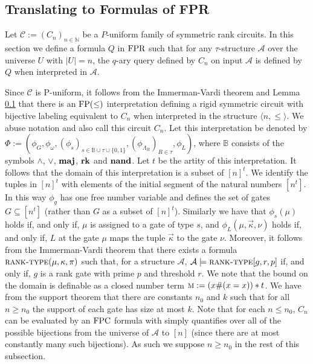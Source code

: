 \documentclass[../paper.tex]{subfiles}
\begin{document}
\subsection{Translating to Formulas of FPR}
Let $\mathcal{C}:= (C_n)_{n \in \mathbb{N}}$ be a $P$-uniform family of
symmetric rank circuits. In this section we define a formula $Q$ in $\text{\upshape FPR}$ such
that for any $\tau$-structure $\mathcal{A}$ over the universe $U$ with $\vert U
\vert = n$, the $q$-ary query defined by $C_n$ on input $\mathcal{A}$ is defined
by $Q$ when interpreted in $\mathcal{A}$.

Since $\mathcal{C}$ is P-uniform, it follows from the Immerman-Vardi theorem and Lemma \ref{} that there is an $\text{\upshape FP}(\leq)$ interpretation defining a rigid symmetric circuit with bijective labeling equivalent to $C_n$ when interpreted in the structure $\langle n, \leq \rangle$. We abuse notation and also call this circuit $C_n$. Let this interpretation be denoted by $\Phi :=  (\phi_G, \phi_\omega, (\phi_s)_{ s \in \mathbb{B} \cup \tau \cup \{0,1\}}, (\phi_{\Lambda_R})_{R \in \tau}, \phi_L)$, where $\mathbb{B}$ consists of the symbols $\land$, $\lor$, $\text{\textbf{maj}}$, $\text{\textbf{rk}}$ and $\text{\textbf{nand}}$. Let $t$ be the artity of this interpretation. It follows that the domain of this interpretation is a subset of $[n]^t$. We identify the tuples in $[n]^t$ with elements of the initial segment of the natural numbers $[n^t]$. In this way $\phi_g$ has one free number variable and defines the set of gates $G \subseteq [n^t]$ (rather than $G$ as a subset of $[n]^t$). Similarly we have that $\phi_s (\mu)$ holds if, and only if, $\mu$ is assigned to a gate of type $s$, and $\phi_L (\mu, \vec{\kappa}, \nu)$ holds if, and only if, $L$ at the gate $\mu$ maps the tuple $\vec{\kappa}$ to the gate $\nu$. Moreover, it follows from the Immerman-Vardi theorem that there exists a formula $\textsc{rank-type}(\mu, \kappa , \pi)$ such that, for a structure $\mathcal{A}$, $\mathcal{A} \models \textsc{rank-type}[g, r, p]$ if, and only if, $g$ is a rank gate with prime $p$ and threshold $r$. We note that the bound on the domain is definable as a closed number term $\textsc{m} := (x\# (x = x))*t$. 
We have from the support theorem that there are constants $n_0$ and $k$ such that for all $n \geq n_0$ the support of each gate has size at most $k$. Note that for each $n \leq n_0$, $C_n$ can be evaluated by an $\text{\upshape FPC}$ formula with simply quantifies over all of the possible bijections from the universe of $\mathcal{A}$ to $[n]$ (since there are at most constantly many such bijections). As such we suppose $n \geq n_0$ in the rest of this subsection. 
\end{document}
